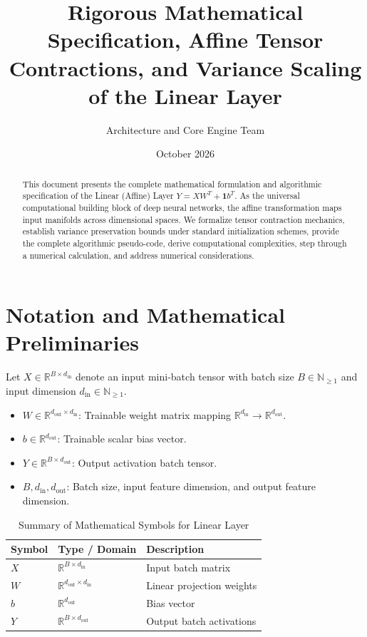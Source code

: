 \documentclass[11pt,a4paper]{article}
\title{\textbf{Rigorous Mathematical Specification, Affine Tensor Contractions, and Variance Scaling of the Linear Layer}}
\author{Architecture and Core Engine Team}
\date{October 2026}
\theoremstyle{definition}
\begin{document}
\maketitle

\begin{abstract}
This document presents the complete mathematical formulation and algorithmic specification of the Linear (Affine) Layer $Y = X W^T + \mathbf{1} b^T$. As the universal computational building block of deep neural networks, the affine transformation maps input manifolds across dimensional spaces. We formalize tensor contraction mechanics, establish variance preservation bounds under standard initialization schemes, provide the complete algorithmic pseudo-code, derive computational complexities, step through a numerical calculation, and address numerical considerations.
\end{abstract}

\section{Notation and Mathematical Preliminaries}

Let $X \in \mathbb{R}^{B \times d_{\text{in}}}$ denote an input mini-batch tensor with batch size $B \in \mathbb{N}_{\ge 1}$ and input dimension $d_{\text{in}} \in \mathbb{N}_{\ge 1}$.

\begin{itemize}
    \item $W \in \mathbb{R}^{d_{\text{out}} \times d_{\text{in}}}$: Trainable weight matrix mapping $\mathbb{R}^{d_{\text{in}}} \to \mathbb{R}^{d_{\text{out}}}$.
    \item $b \in \mathbb{R}^{d_{\text{out}}}$: Trainable scalar bias vector.
    \item $Y \in \mathbb{R}^{B \times d_{\text{out}}}$: Output activation batch tensor.
    \item $B, d_{\text{in}}, d_{\text{out}}$: Batch size, input feature dimension, and output feature dimension.
\end{itemize}

\begin{table}[h]
\centering
\caption{Summary of Mathematical Symbols for Linear Layer}
\begin{tabular}{lll}
\toprule
\textbf{Symbol} & \textbf{Type / Domain} & \textbf{Description} \\
\midrule
$X$ & $\mathbb{R}^{B \times d_{\text{in}}}$ & Input batch matrix \\
$W$ & $\mathbb{R}^{d_{\text{out}} \times d_{\text{in}}}$ & Linear projection weights \\
$b$ & $\mathbb{R}^{d_{\text{out}}}$ & Bias vector \\
$Y$ & $\mathbb{R}^{B \times d_{\text{out}}}$ & Output batch activations \\
\bottomrule
\end{tabular}
\end{table}
\end{document}
